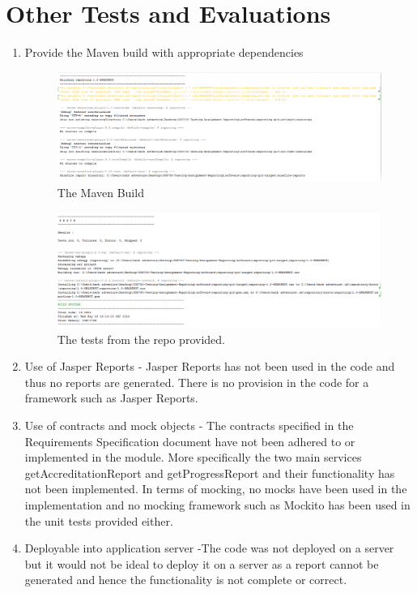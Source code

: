\section{Other Tests and Evaluations}
 
\begin{enumerate}    
\item Provide the Maven build with appropriate dependencies
\begin{figure}[h!]
	\includegraphics[scale=0.6]{./figures/mavenBuild1.PNG}
	\caption{The Maven Build}
\end{figure} 

\begin{figure}[h!]
	\includegraphics[scale=0.6]{./figures/mavenBuild2.PNG}
	\caption{The tests from the repo provided.}
\end{figure}
\item Use of Jasper Reports - Jasper Reports has not been used in the code and thus no reports are generated. There is no provision in the code for a framework such as Jasper Reports. 
\item Use of contracts and mock objects - The contracts specified in the Requirements Specification document have not been adhered to or implemented in the module. More specifically the two main services getAccreditationReport and getProgressReport and their functionality has not been implemented. In terms of mocking, no mocks have been used in the implementation and no mocking framework such as Mockito has been used in the unit tests provided either.
\item Deployable into application server -The code was not deployed on a server but it would not be ideal to deploy it on a server as a report cannot be generated and hence the functionality is not complete or correct.  
\end{enumerate}

